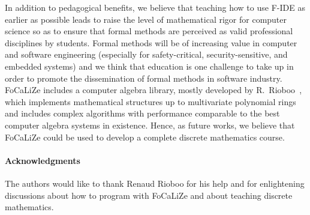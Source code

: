 \documentclass[submission,copyright,creativecommons]{eptcs}
\def\focalize{FoCaLiZe \mbox{}}
\begin{document}
In addition to pedagogical benefits, 
we believe that teaching how to use F-IDE as earlier as possible leads to
raise the level of mathematical rigor for computer science so as to
ensure that formal methods are perceived as valid professional disciplines by
students. 
Formal methods will be of
increasing value in computer and software engineering (especially for 
safety-critical, security-sensitive, and embedded systems)
and we think that education is one challenge to take up 
in order to promote the dissemination of formal methods in software industry.
\focalize includes a
computer algebra library, mostly developed by
R.~Rioboo~\cite{calc01,DBLP:journals/amai/Rioboo09}, which
implements mathematical structures up to multivariate 
polynomial rings and includes complex algorithms
with
performance comparable to the best computer algebra systems in
existence.
Hence, as future works, we believe that \focalize could be used 
to develop a complete discrete
mathematics course.











\paragraph{Acknowledgments}
The authors would like to thank Renaud Rioboo for his help  and
for enlightening discussions about how to program with FoCaLiZe
and about teaching discrete mathematics. 







\end{document}
